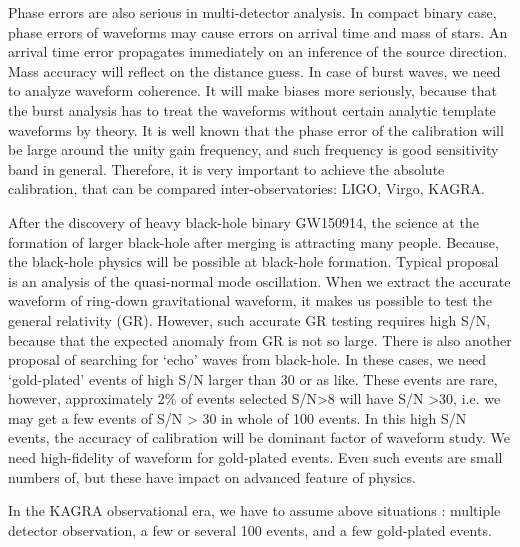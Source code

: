 Phase errors are also serious in multi-detector analysis. 
In compact binary case, phase errors of waveforms may cause errors on arrival time and mass of stars.
An arrival time error propagates immediately on an inference of the source direction.
Mass accuracy will reflect on the distance guess.
In case of burst waves, we need to analyze waveform coherence. It will make biases more seriously, because that the burst analysis has to treat the waveforms without 
certain analytic template waveforms by theory. It is well known that the phase error of the 
calibration will be large around the unity gain frequency, and such frequency is good sensitivity 
band in general. Therefore, it is very important to achieve the absolute calibration, that can be 
compared inter-observatories: LIGO, Virgo, KAGRA.

After the discovery of heavy black-hole binary GW150914, the science at the formation of larger 
black-hole after merging is attracting many people. Because, the black-hole physics will be possible 
at black-hole formation. Typical proposal is an analysis of the quasi-normal mode oscillation. When 
we extract the accurate waveform of ring-down gravitational waveform, it makes us possible to test 
the general relativity (GR). However, such accurate GR testing requires high S/N, because that the 
expected anomaly from GR is not so large. There is also another proposal of searching for `echo' 
waves from black-hole. In these cases, we need `gold-plated' events of high S/N larger than 30 or as 
like. These events are rare, however, approximately 2\% of events selected S/N>8 will have S/N >30, 
i.e. we may get a few events of S/N > 30 in whole of 100 events. 
In this high S/N events, the accuracy of calibration will be dominant factor of waveform study. 
We need high-fidelity of waveform for gold-plated events. 
Even such events are small numbers of, but these have impact on advanced feature of physics.

In the KAGRA observational era, we have to assume above situations : multiple detector observation, 
a few or several 100 events, and a few gold-plated events.



